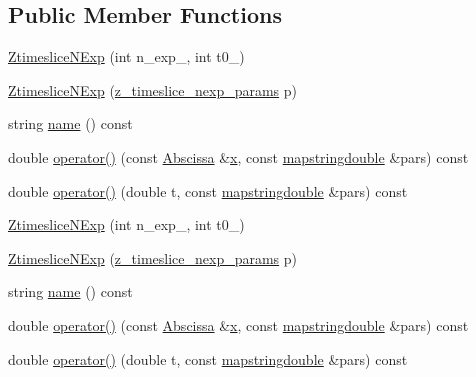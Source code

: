 \subsection*{Public Member Functions}
\begin{DoxyCompactItemize}
\item 
\mbox{\hyperlink{classZtimesliceNExp_a5466f31732f1ad89af3d65562bf0b9c0}{Ztimeslice\+N\+Exp}} (int n\+\_\+exp\+\_\+, int t0\+\_\+)
\item 
\mbox{\hyperlink{classZtimesliceNExp_a75ae13f08fbe15143b9c75ed9c6f0c4e}{Ztimeslice\+N\+Exp}} (\mbox{\hyperlink{structz__timeslice__nexp__params}{z\+\_\+timeslice\+\_\+nexp\+\_\+params}} p)
\item 
string \mbox{\hyperlink{classZtimesliceNExp_a012d885734f62a67b2d1ffc0d4128b0b}{name}} () const
\item 
double \mbox{\hyperlink{classZtimesliceNExp_af9ac01b3a80221dd8bf1a0a11cbdbb66}{operator()}} (const \mbox{\hyperlink{classAbscissa}{Abscissa}} \&\mbox{\hyperlink{old__edb_8cc_a63584b830e7aaacb521b11b72291a4bc}{x}}, const \mbox{\hyperlink{lib_2fitting__lib_2includes_8h_a647b481c557c7966517f753340a81d13}{mapstringdouble}} \&pars) const
\item 
double \mbox{\hyperlink{classZtimesliceNExp_a8d550e27c4abc64a0498b224259863b7}{operator()}} (double t, const \mbox{\hyperlink{lib_2fitting__lib_2includes_8h_a647b481c557c7966517f753340a81d13}{mapstringdouble}} \&pars) const
\item 
\mbox{\hyperlink{classZtimesliceNExp_a5466f31732f1ad89af3d65562bf0b9c0}{Ztimeslice\+N\+Exp}} (int n\+\_\+exp\+\_\+, int t0\+\_\+)
\item 
\mbox{\hyperlink{classZtimesliceNExp_a75ae13f08fbe15143b9c75ed9c6f0c4e}{Ztimeslice\+N\+Exp}} (\mbox{\hyperlink{structz__timeslice__nexp__params}{z\+\_\+timeslice\+\_\+nexp\+\_\+params}} p)
\item 
string \mbox{\hyperlink{classZtimesliceNExp_a012d885734f62a67b2d1ffc0d4128b0b}{name}} () const
\item 
double \mbox{\hyperlink{classZtimesliceNExp_af9ac01b3a80221dd8bf1a0a11cbdbb66}{operator()}} (const \mbox{\hyperlink{classAbscissa}{Abscissa}} \&\mbox{\hyperlink{old__edb_8cc_a63584b830e7aaacb521b11b72291a4bc}{x}}, const \mbox{\hyperlink{lib_2fitting__lib_2includes_8h_a647b481c557c7966517f753340a81d13}{mapstringdouble}} \&pars) const
\item 
double \mbox{\hyperlink{classZtimesliceNExp_a8d550e27c4abc64a0498b224259863b7}{operator()}} (double t, const \mbox{\hyperlink{lib_2fitting__lib_2includes_8h_a647b481c557c7966517f753340a81d13}{mapstringdouble}} \&pars) const
\end{DoxyCompactItemize}
